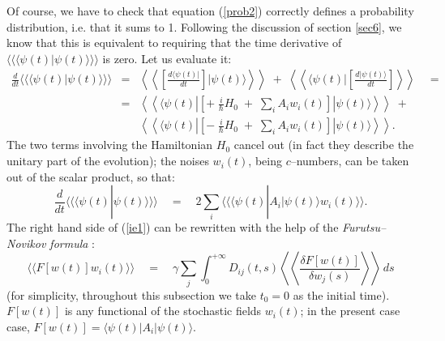 \documentclass[12pt]{article}
\newcommand{\llangle}{\langle\!\langle}
\newcommand{\rrangle}{\rangle\!\rangle}
\newcommand{\LLangle}{\left\langle\!\!\!\left\langle}
\newcommand{\RRangle}{\right\rangle\!\!\!\right\rangle}
\begin{document}
Of course, we have to check that equation (\ref{prob2}) correctly
defines a probability distribution, i.e. that it sums to 1.
Following the discussion of section \ref{sec6}, we know that this
is equivalent to requiring that the time derivative of $\llangle
\langle\psi(t)|\psi(t)\rangle \rrangle$ is zero. Let us evaluate
it:
\begin{eqnarray*}
\frac{d}{dt}\llangle\langle\psi(t)|\psi(t)\rangle\rrangle & = &
\LLangle\left[\frac{d\langle\psi(t)|}{dt}\right]|\psi(t)
\rangle\RRangle\; + \;
\LLangle\langle\psi(t)|\left[\frac{d|\psi(t)\rangle}{dt}\right]
\RRangle\quad = \\
& = & \LLangle\langle\psi(t)|\left[ +\;\frac{i}{\hbar} H_{0}\; +
\;\sum_{i}
A_{i}w_{i}(t)\right]|\psi(t)\rangle\RRangle \; + \\
& &  \LLangle\langle\psi(t)|\left[ -\;\frac{i}{\hbar}H_{0} \; +
\;\sum_{i} A_{i}w_{i}(t)\right]|\psi(t)\rangle\RRangle.
\end{eqnarray*}
The two terms involving the Hamiltonian $H_{0}$ cancel out (in
fact they describe the unitary part of the evolution); the noises
$w_{i}(t)$, being $c$--numbers, can be taken out of the scalar
product, so that:
\begin{equation} \label{ie1}
\frac{d}{dt}\llangle\langle\psi(t)|\psi(t)\rangle\rrangle \quad =
\quad 2 \sum_{i} \llangle\langle\psi(t)|A_{i}|\psi(t)\rangle
w_{i}(t)\rrangle.
\end{equation}
The right hand side of (\ref{ie1}) can be rewritten with the help
of the {\it Furutsu--Novikov formula} \cite{ksv, gi2}:
\begin{equation} \label{fn}
\llangle F[w(t)]w_{i}(t) \rrangle \quad = \quad \gamma \sum_{j}
\int_{0}^{+\infty} D_{ij}(t,s) \LLangle \frac{\delta
F[w(t)]}{\delta w_{j}(s)} \RRangle\, ds
\end{equation}
(for simplicity, throughout this subsection we take $t_{0} = 0$ as
the initial time). $F[w(t)]$ is any functional of the stochastic
fields $w_{i}(t)$; in the present case case, $F[w(t)] =
\langle\psi(t)|A_{i}|\psi(t)\rangle$.
\end{document}
